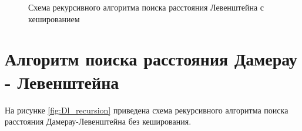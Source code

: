 \begin{figure}[h!]
	
		
	\caption{Схема рекурсивного алгоритма поиска расстояния Левенштейна с кешированием}
		
	\label{fig:l_recursion_matrix}
		
\end{figure}


\newpage
\section{Алгоритм поиска расстояния Дамерау - Левенштейна}

На рисунке \ref{fig:Dl_recursion} приведена схема рекурсивного алгоритма поиска расстояния Дамерау-Левенштейна без кеширования.

